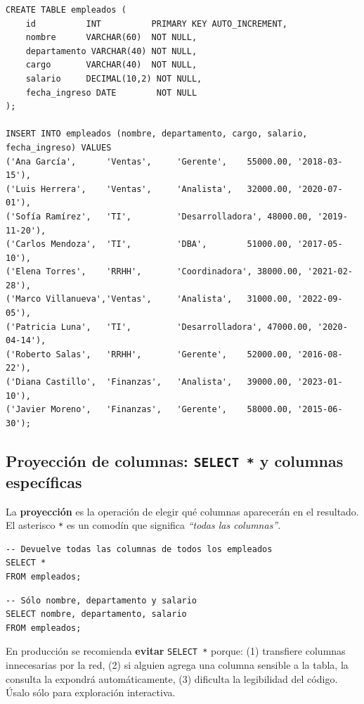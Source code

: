 \begin{lstlisting}[caption={Creación e inicialización de la tabla \texttt{empleados}.}]
CREATE TABLE empleados (
    id          INT          PRIMARY KEY AUTO_INCREMENT,
    nombre      VARCHAR(60)  NOT NULL,
    departamento VARCHAR(40) NOT NULL,
    cargo       VARCHAR(40)  NOT NULL,
    salario     DECIMAL(10,2) NOT NULL,
    fecha_ingreso DATE        NOT NULL
);

INSERT INTO empleados (nombre, departamento, cargo, salario, fecha_ingreso) VALUES
('Ana García',      'Ventas',     'Gerente',    55000.00, '2018-03-15'),
('Luis Herrera',    'Ventas',     'Analista',   32000.00, '2020-07-01'),
('Sofía Ramírez',   'TI',         'Desarrolladora', 48000.00, '2019-11-20'),
('Carlos Mendoza',  'TI',         'DBA',        51000.00, '2017-05-10'),
('Elena Torres',    'RRHH',       'Coordinadora', 38000.00, '2021-02-28'),
('Marco Villanueva','Ventas',     'Analista',   31000.00, '2022-09-05'),
('Patricia Luna',   'TI',         'Desarrolladora', 47000.00, '2020-04-14'),
('Roberto Salas',   'RRHH',       'Gerente',    52000.00, '2016-08-22'),
('Diana Castillo',  'Finanzas',   'Analista',   39000.00, '2023-01-10'),
('Javier Moreno',   'Finanzas',   'Gerente',    58000.00, '2015-06-30');
\end{lstlisting}

\subsection{Proyección de columnas: \texttt{SELECT *} y columnas específicas}
\clearpage
La \textbf{proyección} es la operación de elegir qué columnas
aparecerán en el resultado.
El asterisco \texttt{*} es un comodín que significa
\textit{``todas las columnas''}.

\begin{lstlisting}[caption={Seleccionar todas las columnas.}]
-- Devuelve todas las columnas de todos los empleados
SELECT *
FROM empleados;
\end{lstlisting}

\begin{lstlisting}[caption={Seleccionar columnas específicas.}]
-- Sólo nombre, departamento y salario
SELECT nombre, departamento, salario
FROM empleados;
\end{lstlisting}

\begin{nota}
En producción se recomienda \textbf{evitar} \texttt{SELECT *} porque:
(1) transfiere columnas innecesarias por la red,
(2) si alguien agrega una columna sensible a la tabla, la consulta
la expondrá automáticamente,
(3) dificulta la legibilidad del código.
Úsalo sólo para exploración interactiva.
\end{nota}

